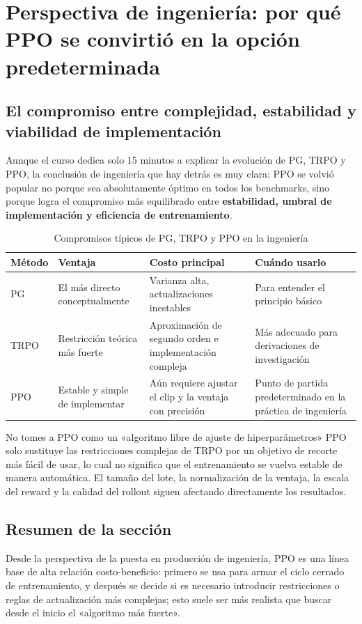 \section{Perspectiva de ingeniería: por qué PPO se convirtió en la opción predeterminada}
\subsection{El compromiso entre complejidad, estabilidad y viabilidad de implementación}
Aunque el curso dedica solo 15 minutos a explicar la evolución de PG, TRPO y PPO, la conclusión de ingeniería que hay detrás es muy clara: PPO se volvió popular no porque sea absolutamente óptimo en todos los benchmarks, sino porque logra el compromiso más equilibrado entre \textbf{estabilidad, umbral de implementación y eficiencia de entrenamiento}.

\begin{table}[H]
\centering
\begin{tabular}{p{2.6cm}p{3.5cm}p{3.7cm}p{3.2cm}}
\toprule
Método & Ventaja & Costo principal & Cuándo usarlo \\
\midrule
PG & El más directo conceptualmente & Varianza alta, actualizaciones inestables & Para entender el principio básico \\
TRPO & Restricción teórica más fuerte & Aproximación de segundo orden e implementación compleja & Más adecuado para derivaciones de investigación \\
PPO & Estable y simple de implementar & Aún requiere ajustar el clip y la ventaja con precisión & Punto de partida predeterminado en la práctica de ingeniería \\
\bottomrule
\end{tabular}
\caption{Compromisos típicos de PG, TRPO y PPO en la ingeniería}
\end{table}

\begin{warningbox}{No tomes a PPO como un «algoritmo libre de ajuste de hiperparámetros»}
PPO solo sustituye las restricciones complejas de TRPO por un objetivo de recorte más fácil de usar, lo cual no significa que el entrenamiento se vuelva estable de manera automática. El tamaño del lote, la normalización de la ventaja, la escala del reward y la calidad del rollout siguen afectando directamente los resultados.
\end{warningbox}

\subsection{Resumen de la sección}
Desde la perspectiva de la puesta en producción de ingeniería, PPO es una línea base de alta relación costo-beneficio: primero se usa para armar el ciclo cerrado de entrenamiento, y después se decide si es necesario introducir restricciones o reglas de actualización más complejas; esto suele ser más realista que buscar desde el inicio el «algoritmo más fuerte».

\newpage

